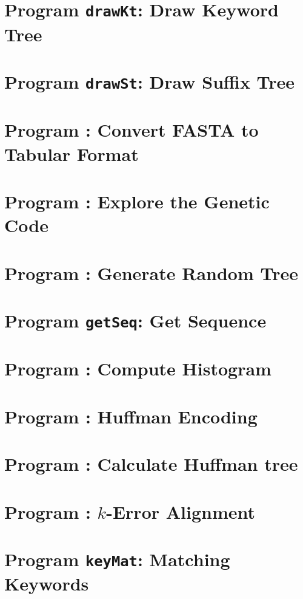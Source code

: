 \documentclass[a4paper]{report}
\begin{document}
\chapter{Program \texttt{drawKt}: Draw Keyword Tree}\label{ch:dkt}

\chapter{Program \texttt{drawSt}: Draw Suffix Tree}\label{ch:dst}

\chapter{Program : Convert FASTA to Tabular
  Format}\label{ch:f2t}

\chapter{Program : Explore the Genetic Code}\label{ch:gc}

\chapter{Program : Generate Random Tree}\label{ch:gt}

\chapter{Program \texttt{getSeq}: Get Sequence}\label{ch:get}

\chapter{Program : Compute Histogram}\label{ch:his}

\chapter{Program : Huffman Encoding}\label{ch:huf}

\chapter{Program : Calculate Huffman tree}\label{ch:hut}

\chapter{Program : $k$-Error Alignment}\label{ch:ke}

\chapter{Program \texttt{keyMat}: Matching Keywords}\label{ch:km}

\end{document}
